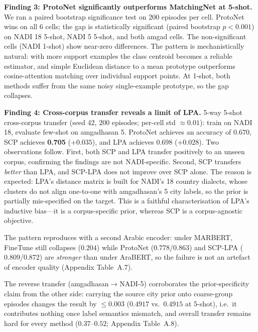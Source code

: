 \documentclass[11pt]{article}
\begin{document}
\textbf{Finding 3: ProtoNet significantly outperforms
MatchingNet at 5-shot.} We ran a paired bootstrap significance
test on 200 episodes per cell. ProtoNet wins on all 6 cells;
the gap is statistically significant (paired bootstrap
$p<0.001$) on NADI 18 5-shot, NADI 5 5-shot, and both amgad
cells. The non-significant cells (NADI 1-shot) show near-zero
differences. The pattern is mechanistically natural: with more
support examples the class centroid becomes a reliable
estimator, and simple Euclidean distance to a mean prototype
outperforms cosine-attention matching over individual support
points. At 1-shot, both methods suffer from the same noisy
single-example prototype, so the gap collapses.

\textbf{Finding 4: Cross-corpus transfer reveals a limit of
LPA.} 5-way 5-shot cross-corpus transfer (seed 42, 200 episodes; per-cell std $\approx 0.01$): train on NADI 18, evaluate few-shot on amgadhasan 5. ProtoNet achieves an accuracy of $0.670$, SCP achieves \textbf{0.705} ($+0.035$), and LPA achieves $0.698$ ($+0.028$). Two observations follow. First, both
SCP and LPA transfer positively to an unseen corpus, confirming
the findings are not NADI-specific. Second, SCP transfers
\emph{better} than LPA, and SCP-LPA does not improve over SCP
alone. The reason is expected: LPA's distance matrix is built
for NADI's 18 country dialects, whose clusters do not align
one-to-one with amgadhasan's 5 city labels, so the prior is
partially mis-specified on the target. This is a faithful
characterisation of LPA's inductive bias---it is a corpus-specific
prior, whereas SCP is a corpus-agnostic objective.

 The pattern reproduces with a second Arabic encoder: under MARBERT,
 FineTune still collapses ($0.204$) while ProtoNet ($0.778$/$0.863$)
 and SCP-LPA ($0.809$/$0.872$) are \emph{stronger} than under
 AraBERT, so the failure is not an artefact of encoder quality
 (Appendix Table~A.7).

 The reverse transfer (amgadhasan$\to$NADI-5) corroborates the
 prior-specificity claim from the other side: carrying the source
 city prior onto coarse-group episodes changes the result by
${\le}0.003$ ($0.4917$ vs.\ $0.4915$ at 5-shot), i.e.\ it
 contributes nothing once label semantics mismatch, and overall
 transfer remains hard for every method ($0.37$--$0.52$;
 Appendix Table~A.8).
\end{document}
